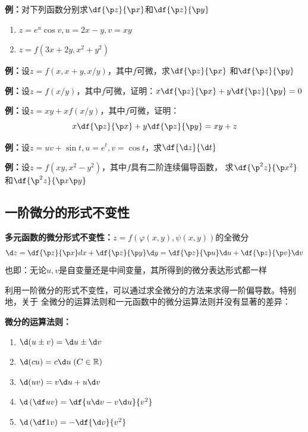{\bf 例：}对下列函数分别求$\df{\p z}{\p x}$和$\df{\p z}{\p y}$
\begin{enumerate}[(1)]
  \setlength{\itemindent}{1cm}
  \item $z=e^u\cos v,u=2x-y,v=xy$
  \item $z=f(3x+2y,x^2+y^2)$
\end{enumerate}


{\bf 例：}设$z=f(x,x+y,x/y)$，其中$f$可微，求$\df{\p z}{\p x}$
和$\df{\p z}{\p y}$

{\bf 例：}设$z=f(x/y)$，其中$f$可微，证明：$x\df{\p z}{\p x}+y
\df{\p z}{\p y}=0$

{\bf 例：}设$z=xy+xf(x/y)$，其中$f$可微，证明：
$$x\df{\p z}{\p x}+y\df{\p z}{\p y}=xy+z$$

{\bf 例：}设$z=uv+\sin t,u=e^t,v=\cos t$，求$\df{\d z}{\d t}$

{\bf 例：}设$z=f(xy,x^2-y^2)$，其中$f$具有二阶连续偏导函数，
求$\df{\p^2 z}{\p x^2}$和$\df{\p^2 z}{\p x\p y}$

\subsection{一阶微分的形式不变性}


\begin{thx}
	{\bf 多元函数的微分形式不变性：}$z=f(\varphi(x,y),\psi(x,y))$的全微分
	$${\d z=\df{\p z}{\p x}dx+\df{\p z}{\p y}\d y
	=\df{\p z}{\p u}\d u+\df{\p z}{\p v}\d v}$$
	也即：{\kaishu 无论$u,v$是自变量还是中间变量，其所得到的微分表达形式都一样}
\end{thx}

利用一阶微分的形式不变性，可以通过求全微分的方法来求得一阶偏导数。特别地，关于
全微分的运算法则和一元函数中的微分运算法则并没有显著的差异：
\begin{thx}
	{\bf 微分的运算法则：}
	\begin{enumerate}[(1)]
	  \setlength{\itemindent}{1cm}
	  \item $\d(u\pm v)=\d u\pm \d v$
	  \item $\d(cu)=c\d u\;(C\in\mathbb{R})$
	  \item $\d(uv)=v\d u+u\d v$
	  \item $\d\left(\df uv\right)=\df{u\d v-v\d u}{v^2}$
	  \item $\d\left(\df 1v\right)=-\df{\d v}{v^2}$
	\end{enumerate}
\end{thx}

